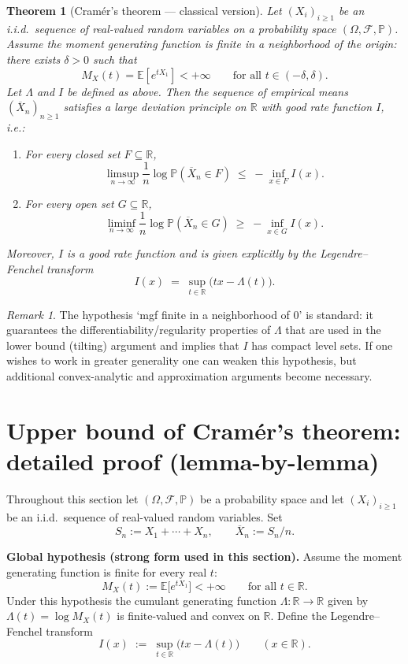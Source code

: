 \documentclass[12pt]{article}
\newtheorem{theorem}{Theorem}[section]
\theoremstyle{definition}
\theoremstyle{remark}
\newtheorem*{remark}{Remark}
\begin{document}
\begin{theorem}[Cramér's theorem --- classical version]\label{thm:cramer}
Let $(X_i)_{i\ge 1}$ be an i.i.d.\ sequence of real-valued random variables on a probability space $(\Omega,\mathcal{F},\mathbb{P})$.  Assume the moment generating function is finite in a neighborhood of the origin: there exists $\delta>0$ such that
\[
M_X(t)=\mathbb{E}[e^{t X_1}] < +\infty \qquad\text{for all } t\in(-\delta,\delta).
\]
Let $\Lambda$ and $I$ be defined as above.  Then the sequence of empirical means $(\overline{X}_n)_{n\ge 1}$ satisfies a large deviation principle on $\mathbb{R}$ with good rate function $I$, i.e.:
\begin{enumerate}
\item For every closed set $F\subseteq\mathbb{R}$,
\[
\limsup_{n\to\infty}\frac{1}{n}\log \mathbb{P}(\overline{X}_n\in F)
\;\le\; -\inf_{x\in F} I(x).
\]
\item For every open set $G\subseteq\mathbb{R}$,
\[
\liminf_{n\to\infty}\frac{1}{n}\log \mathbb{P}(\overline{X}_n\in G)
\;\ge\; -\inf_{x\in G} I(x).
\]
\end{enumerate}
Moreover, $I$ is a good rate function and is given explicitly by the Legendre--Fenchel transform
\[
I(x) \;=\; \sup_{t\in\mathbb{R}} \big( t x - \Lambda(t) \big).
\]
\end{theorem}

\begin{remark}
The hypothesis `mgf finite in a neighborhood of $0$' is standard: it guarantees the differentiability/regularity properties of $\Lambda$ that are used in the lower bound (tilting) argument and implies that $I$ has compact level sets.  If one wishes to work in greater generality one can weaken this hypothesis, but additional convex-analytic and approximation arguments become necessary.
\end{remark}


\section{Upper bound of Cramér's theorem: detailed proof (lemma-by-lemma)}

Throughout this section let $(\Omega,\mathcal F,\mathbb P)$ be a probability space and
let $(X_i)_{i\ge 1}$ be an i.i.d.\ sequence of real-valued random variables.  Set
\[
S_n := X_1+\cdots+X_n,\qquad \overline X_n := S_n/n.
\]

\medskip

\noindent\textbf{Global hypothesis (strong form used in this section).}
Assume the moment generating function is finite for every real \(t\):
\[
M_X(t):=\mathbb{E}\big[e^{t X_1}\big] < +\infty \qquad\text{for all } t\in\mathbb R.
\]
Under this hypothesis the cumulant generating function
\(\Lambda:\mathbb R\to\mathbb R\) given by \(\Lambda(t)=\log M_X(t)\) is finite-valued
and convex on \(\mathbb R\).  Define the Legendre--Fenchel transform
\[
I(x) \;:=\; \sup_{t\in\mathbb R}\big( t x - \Lambda(t)\big)\qquad(x\in\mathbb R).
\]
\end{document}

